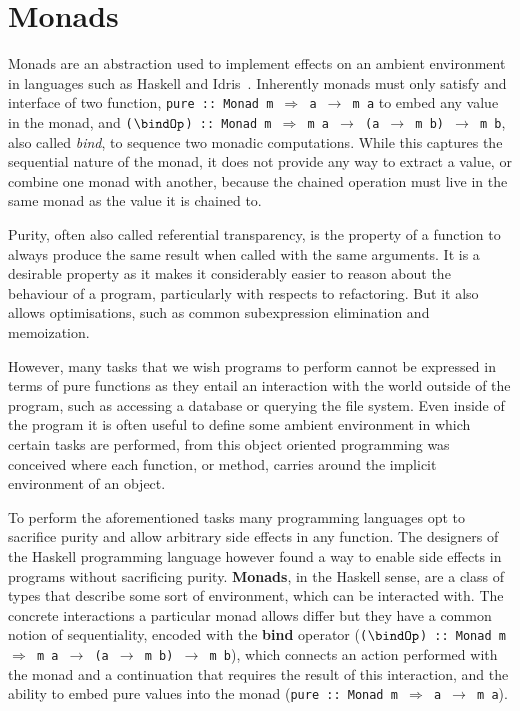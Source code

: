 \section{Monads}

\label{sec:transformers}

Monads are an abstraction used to implement effects on an ambient environment in
languages such as Haskell and Idris~\cite{wadler-monads}. Inherently monads must
only satisfy and interface of two function, \texttt{pure :: Monad m
  $\Rightarrow$ a $\rightarrow$ m a} to embed any value in the monad, and
\texttt{($\bindOp$) :: Monad m $\Rightarrow$ m a $\rightarrow$ (a $\rightarrow$
  m b) $\rightarrow$ m b}, also called \emph{bind}, to sequence two monadic
computations. While this captures the sequential nature of the monad, it does
not provide any way to extract a value, or combine one monad with another,
because the chained operation must live in the same monad as the value it is
chained to.


Purity, often also called referential transparency, is the property of
a function to always produce the same result when called with the same
arguments. It is a desirable property as it makes it considerably
easier to reason about the behaviour of a program, particularly with
respects to refactoring. But it also allows optimisations, such as
common subexpression elimination and memoization.

However, many tasks that we wish programs to perform cannot be
expressed in terms of pure functions as they entail an interaction
with the world outside of the program, such as accessing a database or
querying the file system. Even inside of the program it is often
useful to define some ambient environment in which certain tasks are
performed, from this object oriented programming was conceived where
each function, or method, carries around the implicit environment of
an object.

To perform the aforementioned tasks many programming languages opt to sacrifice
purity and allow arbitrary side effects in any function. The designers of the
Haskell programming language however found a way to enable side effects in
programs without sacrificing purity. \textbf{Monads}, in the Haskell sense, are
a class of types that describe some sort of environment, which can be interacted
with. The concrete interactions a particular monad allows differ but they have a
common notion of sequentiality, encoded with the \textbf{bind} operator
(\texttt{($\bindOp$) :: Monad m $\Rightarrow$ m a $\rightarrow$ (a $\rightarrow$
  m b) $\rightarrow$ m b}), which connects an action performed with the monad
and a continuation that requires the result of this interaction, and the ability
to embed pure values into the monad (\texttt{pure :: Monad m $\Rightarrow$ a
  $\rightarrow$ m a}).

